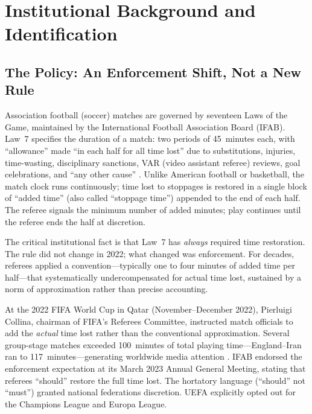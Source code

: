 
\section{Institutional Background and Identification}
\label{sec:background}

\subsection{The Policy: An Enforcement Shift, Not a New Rule}

Association football (soccer) matches are governed by seventeen Laws of the
Game, maintained by the International Football Association Board (IFAB).
Law~7 specifies the duration of a match: two periods of 45~minutes each,
with ``allowance'' made ``in each half for all time lost'' due to
substitutions, injuries, time-wasting, disciplinary sanctions, VAR (video
assistant referee) reviews, goal celebrations, and ``any other cause''
\citep{ifab2023laws}. Unlike American football or basketball, the match
clock runs continuously; time lost to stoppages is restored in a single
block of ``added time'' (also called ``stoppage time'') appended to the end
of each half. The referee signals the minimum number of added minutes; play
continues until the referee ends the half at discretion.

The critical institutional fact is that Law~7 has \textit{always} required
time restoration. The rule did not change in 2022; what changed was
enforcement. For decades, referees applied a convention---typically one to
four minutes of added time per half---that systematically undercompensated
for actual time lost, sustained by a norm of approximation rather than
precise accounting.

At the 2022 FIFA World Cup in Qatar (November--December 2022), Pierluigi
Collina, chairman of FIFA's Referees Committee, instructed match officials
to add the \textit{actual} time lost rather than the conventional
approximation. Several group-stage matches exceeded 100~minutes of total
playing time---England--Iran ran to 117~minutes---generating worldwide
media attention \citep{wei2024goal, lames2024goal}. IFAB endorsed the
enforcement expectation at its March 2023 Annual General Meeting, stating
that referees ``should'' restore the full time lost. The hortatory language
(``should'' not ``must'') granted national federations discretion. UEFA
explicitly opted out for the Champions League and Europa League.

